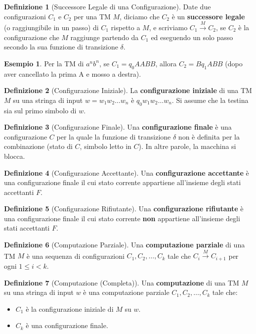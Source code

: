 \documentclass[a4paper]{article}
\theoremstyle{definition} %
\newtheorem{definition}{Definizione}
\newtheorem{example}{Esempio}
\begin{document}
\begin{definition}[Successore Legale di una Configurazione]
    Date due configurazioni $C_1$ e $C_2$ per una TM $M$, diciamo che $C_2$ è un \textbf{successore legale} (o raggiungibile in un passo) di $C_1$ rispetto a $M$, e scriviamo $C_1 \xrightarrow{M} C_2$, se $C_2$ è la configurazione che $M$ raggiunge partendo da $C_1$ ed eseguendo un solo passo secondo la sua funzione di transizione $\delta$.
    \begin{example}
        Per la TM di $a^n b^n$, se $C_1 = q_0 AABB$, allora $C_2 = B q_1 ABB$ (dopo aver cancellato la prima A e mosso a destra).
    \end{example}
\end{definition}

\begin{definition}[Configurazione Iniziale]
    La \textbf{configurazione iniziale} di una TM $M$ su una stringa di input $w = w_1 w_2 \dots w_n$ è $q_0 w_1 w_2 \dots w_n$. Si assume che la testina sia sul primo simbolo di $w$.
\end{definition}

\begin{definition}[Configurazione Finale]
    Una \textbf{configurazione finale} è una configurazione $C$ per la quale la funzione di transizione $\delta$ non è definita per la combinazione (stato di $C$, simbolo letto in $C$). In altre parole, la macchina si blocca.
\end{definition}

\begin{definition}[Configurazione Accettante]
    Una \textbf{configurazione accettante} è una configurazione finale il cui stato corrente appartiene all'insieme degli stati accettanti $F$.
\end{definition}

\begin{definition}[Configurazione Rifiutante]
    Una \textbf{configurazione rifiutante} è una configurazione finale il cui stato corrente \textbf{non} appartiene all'insieme degli stati accettanti $F$.
\end{definition}

\begin{definition}[Computazione Parziale]
    Una \textbf{computazione parziale} di una TM $M$ è una sequenza di configurazioni $C_1, C_2, \dots, C_k$ tale che $C_i \xrightarrow{M} C_{i+1}$ per ogni $1 \le i < k$.
\end{definition}

\begin{definition}[Computazione (Completa)]
    Una \textbf{computazione} di una TM $M$ su una stringa di input $w$ è una computazione parziale $C_1, C_2, \dots, C_k$ tale che:
    \begin{itemize}
        \item $C_1$ è la configurazione iniziale di $M$ su $w$.
        \item $C_k$ è una configurazione finale.
    \end{itemize}
\end{definition}
\end{document}
